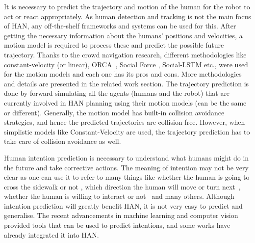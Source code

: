 
It is necessary to predict the trajectory and motion of the human for the robot to act or react appropriately. As human detection and tracking is not the main focus of HAN, any off-the-shelf frameworks and systems can be used for this. After getting the necessary information about the humans' positions and velocities, a motion model is required to process these and predict the possible future trajectory. Thanks to the crowd navigation research, different methodologies like constant-velocity (or linear), ORCA~\cite{berg2011reciprocal}, Social Force \cite{helbing1995social}, Social-LSTM \cite{alahi2016social} etc., were used for the motion models and each one has its pros and cons. More methodologies and details are presented in the related work section. The trajectory prediction is done by forward simulating all the agents (humans and the robot) that are currently involved in HAN planning using their motion models (can be the same or different). Generally, the motion model has built-in collision avoidance strategies, and hence the predicted trajectories are collision-free. However, when simplistic models like Constant-Velocity are used, the trajectory prediction has to take care of collision avoidance as well.

Human intention prediction is necessary to understand what humans might do in the future and take corrective actions. The meaning of intention may not be very clear as one can use it to refer to many things like whether the human is going to cross the sidewalk or not \cite{kohler2012early}, which direction the human will move or turn next~\cite{peddi2020data}, whether the human is willing to interact or not~\cite{ratsamee2013social} and many others. Although intention prediction will greatly benefit HAN, it is not very easy to predict and generalise. The recent advancements in machine learning and computer vision provided tools that can be used to predict intentions, and some works \cite{peddi2020data, ratsamee2013social} have already integrated it into HAN.

